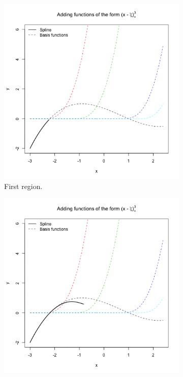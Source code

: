 \documentclass[12pt, letterpaper]{article}
\theoremstyle{definition}
\begin{document}
\begin{figure}
\begin{subfigure}{0.49\textwidth}
\centering
\includegraphics[width=1\linewidth]{img/spline_cubic/15}
\caption{First region.}
\end{subfigure}
\hfill
\begin{subfigure}{0.49\textwidth}
\centering
\includegraphics[width=1\linewidth]{img/spline_cubic/41}

\end{subfigure}
\end{figure}
\end{document}
